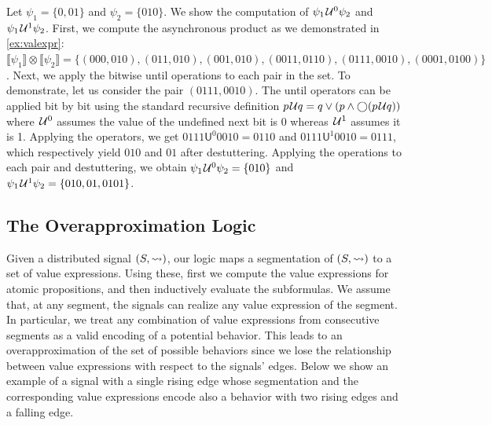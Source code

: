 \begin{example}
	Let $\psi_1 = \{ 0, 01 \}$ and $\psi_2 = \{ 010 \}$.
	We show the computation of $\psi_1 \kern.1em\mathcal{U}^0 \psi_2$ and $\psi_1 \kern.1em\mathcal{U}^1 \psi_2$.
	First, we compute the asynchronous product as we demonstrated in \cref{ex:valexpr}: $\llbracket \psi_1 \rrbracket \otimes \llbracket \psi_2 \rrbracket = \{ (000,010), (011,010), (001,010), (0011,0110), (0111,0010), (0001,0100)\}$.
	Next, we apply the bitwise until operations to each pair in the set.
	To demonstrate, let us consider the pair $(0111,0010)$.
	The until operators can be applied bit by bit using the standard recursive definition $p \kern.1em\mathcal{U} q = q \lor (p \land \bigcirc (p \kern.1em\mathcal{U} q))$ where $\kern.1em\mathcal{U}^0$ assumes the value of the undefined next bit is 0 whereas $\kern.1em\mathcal{U}^1$ assumes it is 1.
	Applying the operators, we get $0111 \mathsf{U}^0 0010 = 0110$ and $0111 \mathsf{U}^1 0010 = 0111$, which respectively yield $010$ and $01$ after destuttering.
	Applying the operations to each pair and destuttering, we obtain $\psi_1 \kern.1em\mathcal{U}^0 \psi_2 = \{ 010 \}$ and $\psi_1 \kern.1em\mathcal{U}^1 \psi_2 = \{ 010, 01, 0101\}$.
\end{example}

\subsection{The Overapproximation Logic}
Given a distributed signal $(S,{\rightsquigarrow})$, our logic maps a segmentation of $(S,{\rightsquigarrow})$ to a set of value expressions.
Using these, first we compute the value expressions for atomic propositions, and then inductively evaluate the subformulas.
We assume that, at any segment, the signals can realize any value expression of the segment.
In particular, we treat any combination of value expressions from consecutive segments as a valid encoding of a potential behavior.
This leads to an overapproximation of the set of possible behaviors since we lose the relationship between value expressions with respect to the signals' edges.
Below we show an example of a signal with a single rising edge whose segmentation and the corresponding value expressions encode also a behavior with two rising edges and a falling edge.

